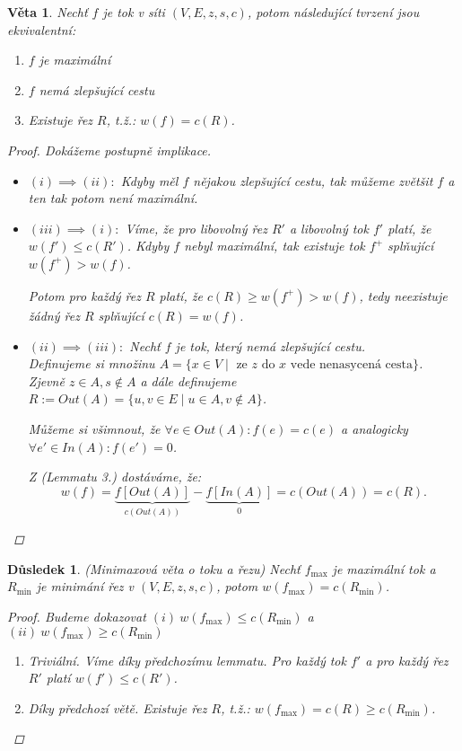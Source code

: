 \documentclass[10pt,a4paper]{article}
\newtheorem{veta}{Věta}
\newtheorem{dusledek}{Důsledek}
\begin{document}
\begin{veta}\normalfont Nechť $f$ je tok v síti $(V, E, z, s, c)$, potom následující tvrzení jsou ekvivalentní:
    \begin{enumerate}[label=(\roman*)]
        \item $f$ je maximální
        \item $f$ nemá zlepšující cestu
        \item Existuje řez $R$, t.ž.: $w(f) = c(R)$.
    \end{enumerate}
    \begin{proof}
        Dokážeme postupně implikace.
        \begin{itemize}
            \item $(i)\implies (ii):$ Kdyby měl $f$ nějakou zlepšující cestu, tak můžeme zvětšit $f$ a ten tak potom není maximální.
            \item $(iii) \implies (i):$ Víme, že pro libovolný řez $R'$ a libovolný tok $f'$ platí, že $w(f')\leq c(R')$.
                Kdyby $f$ nebyl maximální, tak existuje tok $f^+$ splňující $w(f^+)>w(f)$. 
                
                Potom pro každý řez $R$ platí, že $c(R)\geq w(f^+)>w(f)$, tedy neexistuje žádný řez $R$ splňující $c(R) = w(f)$.
            \item $(ii) \implies (iii):$ Nechť $f$ je tok, který nemá zlepšující cestu.\\
                Definujeme si množinu $A=\{x\in V\mid \text{ ze $z$ do $x$ vede nenasycená cesta}\}$.
                Zjevně $z\in A, s\notin A$ a dále definujeme $R:= Out(A) = \{u,v\in E \mid u\in A, v\notin A\}$.
                
                Můžeme si všimnout, že $\forall e \in Out(A): f(e) = c(e)$ a analogicky $\forall e' \in In(A): f(e') = 0$.
                
                Z \textit{(Lemmatu 3.)} dostáváme, že: $$w(f) = \underbrace{f[Out(A)]}_{c(Out(A))}-\underbrace{f[In(A)]}_{0} =c(Out(A))= c(R).$$
        \end{itemize}
    \end{proof}
\end{veta}

\begin{dusledek} (Minimaxová věta o toku a řezu) \normalfont 
    Nechť $f_{\max}$ je maximální tok a $R_{\min}$ je minimání řez v $(V, E, z,s,c)$, potom $w(f_{\max}) =  c(R_{\min})$.
    \begin{proof}
        Budeme dokazovat $(i)~  w(f_{\max}) \leq c(R_{\min})$ a $(ii) ~w(f_{\max}) \geq c(R_{\min})$
        \begin{enumerate}[label=(\roman*)]
            \item Triviální. Víme díky předchozímu lemmatu. Pro každý tok $f'$ a pro každý řez $R'$ platí $w(f') \leq c(R')$.
            \item Díky předchozí větě. Existuje řez $R$, t.ž.: $w(f_{\max}) = c(R) \geq c(R_{\min})$.
        \end{enumerate}
    \end{proof}
\end{dusledek}
\end{document}
